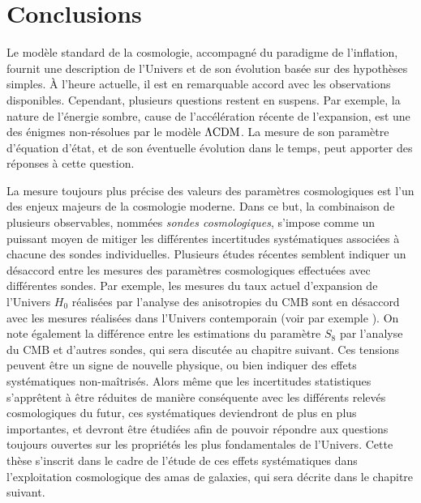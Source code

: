 \section{Conclusions}

Le modèle standard de la cosmologie, accompagné du paradigme de l'inflation, fournit une description de l'Univers et de son évolution basée sur des hypothèses simples.
À l'heure actuelle, il est en remarquable accord avec les observations disponibles.
Cependant, plusieurs questions restent en suspens.
Par exemple, la nature de l'énergie sombre, cause de l'accélération récente de l'expansion, est une des énigmes non-résolues par le modèle $\Lambda {\rm CDM}$.
La mesure de son paramètre d'équation d'état, et de son éventuelle évolution dans le temps, peut apporter des réponses à cette question.

La mesure toujours plus précise des valeurs des paramètres cosmologiques est l'un des enjeux majeurs de la cosmologie moderne.
Dans ce but, la combinaison de plusieurs observables, nommées \textit{sondes cosmologiques}, s'impose comme un puissant moyen de mitiger les différentes incertitudes systématiques associées à chacune des sondes individuelles.
Plusieurs études récentes semblent indiquer un désaccord entre les mesures des paramètres cosmologiques effectuées avec différentes sondes.
Par exemple, les mesures du taux actuel d'expansion de l'Univers $H_0$ réalisées par l'analyse des anisotropies du CMB sont en désaccord avec les mesures réalisées dans l'Univers contemporain (voir par exemple \cite{riess_large_2019,wong_h0licow_2020,efstathiou_h0_2021, freedman_measurements_2021}).
On note également la différence entre les estimations du paramètre $S_8$ par l'analyse du CMB et d'autres sondes, qui sera discutée au chapitre suivant.
Ces tensions peuvent être un signe de nouvelle physique, ou bien indiquer des effets systématiques non-maîtrisés.
Alors même que les incertitudes statistiques s'apprêtent à être réduites de manière conséquente avec les différents relevés cosmologiques du futur, ces systématiques deviendront de plus en plus importantes, et devront être étudiées afin de pouvoir répondre aux questions toujours ouvertes sur les propriétés les plus fondamentales de l'Univers.
Cette thèse s'inscrit dans le cadre de l'étude de ces effets systématiques dans l'exploitation cosmologique des amas de galaxies, qui sera décrite dans le chapitre suivant.
